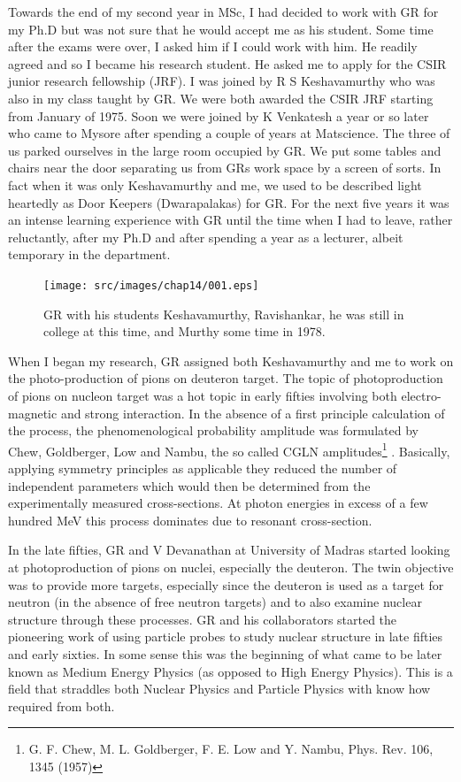 Towards the end of my second year in MSc, I had decided to work with GR for my Ph.D but was not sure that he would accept me as his student. Some time after the exams were over, I asked him if I could work with him. He readily agreed and so I became his research student. He asked me to apply for the CSIR junior research fellowship (JRF). I was joined by R S Keshavamurthy who was also in my class taught by GR. We were both awarded the CSIR JRF starting from January of 1975. Soon we were joined by K Venkatesh a year or so later who came to Mysore after spending a couple of years at Matscience. The three of us parked ourselves in the large room occupied by GR. We put some tables and chairs near the door separating us from GRs work space by a screen of sorts. In fact when it was only Keshavamurthy and me, we used to be described light heartedly as Door Keepers (Dwarapalakas) for GR. For the next five years it was an intense learning experience with GR until the time when I had to leave, rather reluctantly, after my Ph.D and after spending a year as a lecturer, albeit temporary in the department.
\begin{figure}[H]
\centering
\texttt{[image: src/images/chap14/001.eps]}
\caption{GR with his students Keshavamurthy, Ravishankar, he was still in college at this time, and Murthy some time in 1978.}\label{chap14-fig001}
\end{figure}

When I began my research, GR assigned both Keshavamurthy and me to work on the photo-production of pions on deuteron target. The topic of photoproduction of pions on nucleon target was a hot topic in early fifties involving both electro-magnetic and strong interaction. In the absence of a first principle calculation of the process, the phenomenological probability amplitude was formulated by Chew, Goldberger, Low and Nambu, the so called CGLN amplitudes\footnote{G. F. Chew, M. L. Goldberger, F. E. Low and Y. Nambu, Phys. Rev. 106, 1345 (1957)} . Basically, applying symmetry principles as applicable they reduced the number of independent parameters which would then be determined from the experimentally measured cross-sections. At photon energies in excess of a few hundred MeV this process dominates due to resonant cross-section.

In the late fifties, GR and V Devanathan at University of Madras started looking at photoproduction of pions on nuclei, especially the deuteron. The twin objective was to provide more targets, especially since the deuteron is used as a target for neutron (in the absence of free neutron targets) and to also examine nuclear structure through these processes. GR and his collaborators started the pioneering work of using particle probes to study nuclear structure in late fifties and early sixties. In some sense this was the beginning of what came to be later known as Medium Energy Physics (as opposed to High Energy Physics). This is a field that straddles both Nuclear Physics and Particle Physics with know how required from both.

